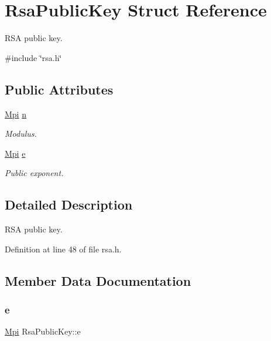 \hypertarget{structRsaPublicKey}{}\section{Rsa\+Public\+Key Struct Reference}
\label{structRsaPublicKey}


R\+SA public key.  




{\ttfamily \#include \char`\"{}rsa.\+h\char`\"{}}

\subsection*{Public Attributes}
\begin{DoxyCompactItemize}
\item 
\hyperlink{structMpi}{Mpi} \hyperlink{structRsaPublicKey_a51b3d236796d7d46c15d3e6bc7e5acb2}{n}
\begin{DoxyCompactList}\small\item\em Modulus. \end{DoxyCompactList}\item 
\hyperlink{structMpi}{Mpi} \hyperlink{structRsaPublicKey_af293e256864ab9ac9f80d1e6552693da}{e}
\begin{DoxyCompactList}\small\item\em Public exponent. \end{DoxyCompactList}\end{DoxyCompactItemize}


\subsection{Detailed Description}
R\+SA public key. 

Definition at line 48 of file rsa.\+h.



\subsection{Member Data Documentation}
\mbox{\label{structRsaPublicKey_af293e256864ab9ac9f80d1e6552693da}} 
\subsubsection{\texorpdfstring{e}{e}}
{\footnotesize\ttfamily \hyperlink{structMpi}{Mpi} Rsa\+Public\+Key\+::e}



